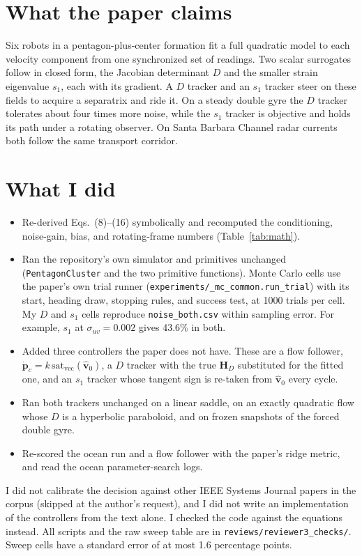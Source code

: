 \documentclass[10.5pt]{article}
\newcommand{\satv}{\mathrm{sat}_{\mathrm{vec}}}
\begin{document}
\section{What the paper claims}

Six robots in a pentagon-plus-center formation fit a full quadratic model to each velocity component from one synchronized set of readings. Two scalar surrogates follow in closed form, the Jacobian determinant $D$ and the smaller strain eigenvalue $s_1$, each with its gradient. A $D$ tracker and an $s_1$ tracker steer on these fields to acquire a separatrix and ride it. On a steady double gyre the $D$ tracker tolerates about four times more noise, while the $s_1$ tracker is objective and holds its path under a rotating observer. On Santa Barbara Channel radar currents both follow the same transport corridor.

\section{What I did}

\begin{itemize}[leftmargin=1.2em]
\item Re-derived Eqs.~(8)--(16) symbolically and recomputed the conditioning, noise-gain, bias, and rotating-frame numbers (Table~\ref{tab:math}).
\item Ran the repository's own simulator and primitives unchanged (\texttt{PentagonCluster} and the two primitive functions). Monte Carlo cells use the paper's own trial runner (\texttt{experiments/\_mc\_common.run\_trial}) with its start, heading draw, stopping rules, and success test, at 1000 trials per cell. My $D$ and $s_1$ cells reproduce \texttt{noise\_both.csv} within sampling error. For example, $s_1$ at $\sigma_{uv}=0.002$ gives 43.6\% in both.
\item Added three controllers the paper does not have. These are a flow follower, $\dot{\mathbf p}_c = k\,\satv(\hat{\mathbf v}_0)$, a $D$ tracker with the true $\mathbf{H}_D$ substituted for the fitted one, and an $s_1$ tracker whose tangent sign is re-taken from $\hat{\mathbf v}_0$ every cycle.
\item Ran both trackers unchanged on a linear saddle, on an exactly quadratic flow whose $D$ is a hyperbolic paraboloid, and on frozen snapshots of the forced double gyre.
\item Re-scored the ocean run and a flow follower with the paper's ridge metric, and read the ocean parameter-search logs.
\end{itemize}
I did not calibrate the decision against other IEEE Systems Journal papers in the corpus (skipped at the author's request), and I did not write an implementation of the controllers from the text alone. I checked the code against the equations instead. All scripts and the raw sweep table are in \texttt{reviews/reviewer3\_checks/}. Sweep cells have a standard error of at most 1.6 percentage points.
\end{document}
